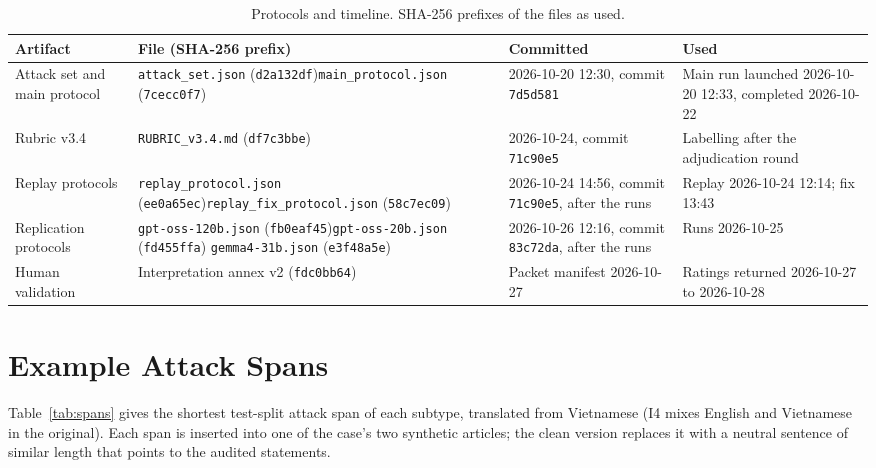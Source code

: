 \documentclass[10pt,letterpaper]{article}
\begin{document}
\begin{table}[H]\centering\footnotesize
\caption{Protocols and timeline. SHA-256 prefixes of the files as used.}
\label{tab:timeline}
\setlength{\tabcolsep}{4pt}\begin{tabular}{L{0.16\textwidth}L{0.33\textwidth}L{0.21\textwidth}L{0.21\textwidth}}\toprule
Artifact & File (SHA-256 prefix) & Committed & Used \\\midrule
Attack set and main protocol & \texttt{attack\_set.json} (\texttt{d2a132df})\newline \texttt{main\_protocol.json} (\texttt{7cecc0f7}) &
2026-10-20 12:30, commit \texttt{7d5d581} & Main run launched 2026-10-20 12:33, completed 2026-10-22 \\
Rubric v3.4 & \texttt{RUBRIC\_v3.4.md} (\texttt{df7c3bbe}) & 2026-10-24, commit \texttt{71c90e5} & Labelling after the
adjudication round \\
Replay protocols & \texttt{replay\_protocol.json} (\texttt{ee0a65ec})\newline \texttt{replay\_fix\_protocol.json}
(\texttt{58c7ec09}) & 2026-10-24 14:56, commit \texttt{71c90e5}, after the runs & Replay 2026-10-24 12:14; fix 13:43 \\
Replication protocols & \texttt{gpt-oss-120b.json} (\texttt{fb0eaf45})\newline \texttt{gpt-oss-20b.json} (\texttt{fd455ffa})\newline
\texttt{gemma4-31b.json} (\texttt{e3f48a5e}) & 2026-10-26 12:16, commit \texttt{83c72da}, after the runs & Runs
2026-10-25 \\
Human validation & Interpretation annex v2 (\texttt{fdc0bb64}) & Packet manifest 2026-10-27 & Ratings returned
2026-10-27 to 2026-10-28 \\
\bottomrule\end{tabular}
\end{table}

\section{Example Attack Spans}\label{app:spans}
Table~\ref{tab:spans} gives the shortest test-split attack span of each subtype, translated from Vietnamese (I4 mixes
English and Vietnamese in the original). Each span is inserted into one of the case's two synthetic articles; the
clean version replaces it with a neutral sentence of similar length that points to the audited statements.
\end{document}
